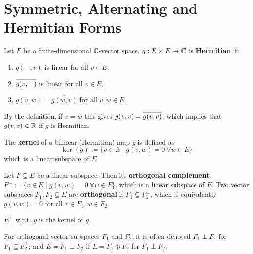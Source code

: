 \section{Symmetric, Alternating and Hermitian Forms}

\begin{definition}[Hermitian]
    Let $E$ be a finite-dimensional $\mathbb{C}$-vector space. $g: E \times E \to \mathbb{C}$ is \textbf{Hermitian} if:
    \begin{enumerate}[label=\roman*)]
        \item $g(-, v)$ is linear for all $v \in E$. 
        \item $\overline{g(v, -)}$ is linear for all $v \in E$.
        \item $g(v, w) = \overline{g(w, v)}$ for all $v, w \in E$.
    \end{enumerate}
\end{definition}

\begin{remark}
    By the definition, if $v = w$ this gives $g(v, v) = \overline{g(v, v)}$, which implies that $g(v, v) \in \mathbb{R}$ if $g$ is Hermitian.
\end{remark}

\begin{definition}
    The \textbf{kernel} of a bilinear (Hermitian) map $g$ is defined as
    \[
        \ker(g) := \{v \in E \mid g(v, w) = 0\ \forall w \in E \}
    \]
    which is a linear subspace of $E$.
\end{definition}

\begin{definition}[Orthogonality]
    Let $F \subseteq E$ be a linear subspace. Then its \textbf{orthogonal complement} $F^{\perp} := \{v \in E \mid g(v, w) = 0\ \forall w \in F\}$. which is a linear subspace of $E$. Two vector subspaces $F_1, F_2 \subseteq E$ are \textbf{orthogonal} if $F_1 \subseteq F_2^{\perp}$, which is equivalently $g(v, w) = 0$ for all $v \in F_1, w \in F_2$.
\end{definition}

\begin{example}
    $E^{\perp}$ w.r.t. $g$ is the kernel of $g$. 
\end{example}

\begin{remark}
    For orthogonal vector subspaces $F_1$ and $F_2$, it is often denoted $F_1 \perp F_2$ for $F_1 \subseteq F_2^{\perp}$; and $E = F_1 \perp F_2$ if $E = F_1 \oplus F_2$ for $F_1 \perp F_2$.
\end{remark}

